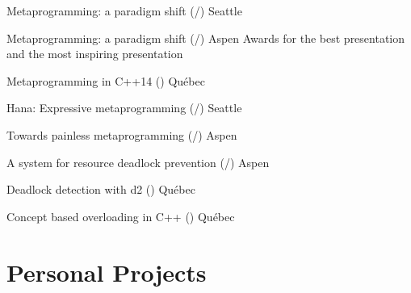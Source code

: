 \documentclass[10pt]{moderncv}
\newcommand{\myhref}[3][blue]{\href{#2}{\color{#1}{#3}}}
\begin{document}
        {Metaprogramming: a paradigm shift (\myhref{http://ldionne.github.io/hana-cppcon-2015}{slides}/\myhref{https://youtu.be/cg1wOINjV9U}{video})}
        {\myhref{http://cppcon.org}{CppCon}}{Seattle}{}{}{}

        {Metaprogramming: a paradigm shift (\myhref{http://ldionne.github.io/hana-cppnow-2015}{slides}/\myhref{http://youtu.be/Z2ABRaQiFHs}{video})}
        {\myhref{http://www.cppnow.org}{C++Now}}{Aspen}{}
        {Awards for the best presentation and the most inspiring presentation}

        {Metaprogramming in C++14 (\myhref{http://ldionne.github.io/hana-opencode-xxii}{french only slides})}
        {\myhref{http://www.opencode.ca}{OpenCode XXII}}{Québec}{}{}

        {Hana: Expressive metaprogramming (\myhref{http://ldionne.github.io/hana-cppcon-2014/}{slides}/\myhref{https://www.youtube.com/watch?v=L2SktfaJPuU}{video})}
        {\myhref{http://cppcon.org}{CppCon}}{Seattle}{}{}

        {Towards painless metaprogramming (\myhref{http://ldionne.github.io/mpl11-cppnow-2014}{slides}/\myhref{https://www.youtube.com/watch?v=8c0aWLuEO0Y}{video})}
        {\myhref{http://www.cppnow.org}{C++Now}}{Aspen}{}{}

        {A system for resource deadlock prevention (\myhref{http://ldionne.github.io/d2-cppnow-2013}{slides}/\myhref{https://www.youtube.com/watch?v=Re67U4zAN-M}{video})}
        {\myhref{http://www.cppnow.org}{C++Now}}{Aspen}{}{}

        {Deadlock detection with d2 (\myhref{http://ldionne.github.io/d2-opencode12}{slides})}
        {\myhref{http://www.opencode.ca}{OpenCode XII}}{Québec}{}{}

        {Concept based overloading in C++ (\myhref{http://docs.google.com/presentation/d/1HpjEz6dJauNoBxMGWzaNuOOoiVwqgISTNWNTwuOo-_8/edit?usp=sharing}{slides})}
        {\myhref{http://www.opencode.ca}{OpenCode IX}}{Québec}{}{}



\section{Personal Projects}
\newcommand{\PersonalProject}[4]{
    \cvline{\myhref{#2}{#1}}{
        \textbf{#3}\newline
        #4
    }
}
\end{document}
